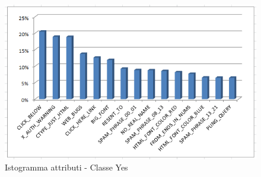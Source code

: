 	\begin{figure}[hbtp]
		\centering
		\includegraphics[width=1\textwidth]{./images/Histogram_Yes.png}
		\caption{Istogramma attributi - Classe Yes}
		\label{YesHist}
	\end{figure}